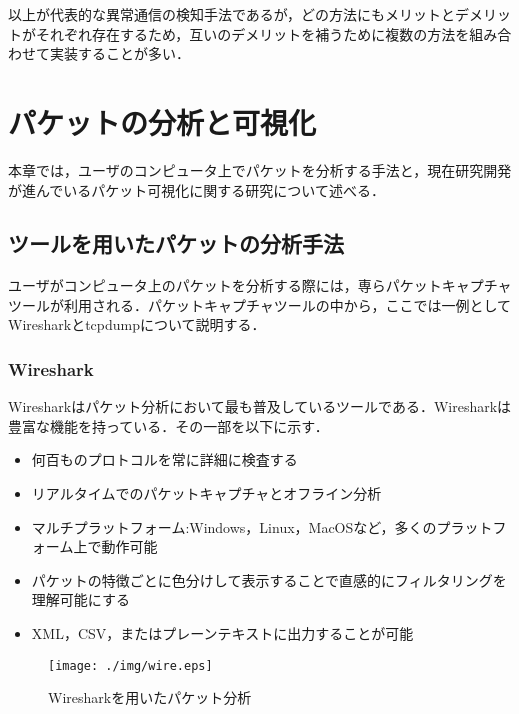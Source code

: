 \documentclass{thesis}
\begin{document}
\vspace{0.2in}
以上が代表的な異常通信の検知手法であるが，どの方法にもメリットとデメリットがそれぞれ存在するため，互いのデメリットを補うために複数の方法を組み合わせて実装することが多い．



\chapter{パケットの分析と可視化}

本章では，ユーザのコンピュータ上でパケットを分析する手法と，現在研究開発が進んでいるパケット可視化に関する研究について述べる．


\section{ツールを用いたパケットの分析手法} \label{sec:ツールを用いたパケットの分析手法}

ユーザがコンピュータ上のパケットを分析する際には，専らパケットキャプチャツールが利用される．パケットキャプチャツールの中から，ここでは一例としてWireshark\cite{Wireshark}とtcpdump\cite{tcpdump}について説明する．

\subsection*{Wireshark}

Wiresharkはパケット分析において最も普及しているツールである．Wiresharkは豊富な機能を持っている．その一部を以下に示す．

\begin{itemize}
\item 何百ものプロトコルを常に詳細に検査する
\item リアルタイムでのパケットキャプチャとオフライン分析
\item マルチプラットフォーム:Windows，Linux，MacOSなど，多くのプラットフォーム上で動作可能
\item パケットの特徴ごとに色分けして表示することで直感的にフィルタリングを理解可能にする
\item XML，CSV，またはプレーンテキストに出力することが可能
\end{itemize}

\begin{figure}[H]
 \center
 \texttt{[image: ./img/wire.eps]}
 \caption{Wiresharkを用いたパケット分析}
 \label{fig:wireshark}
\end{figure}
\end{document}
